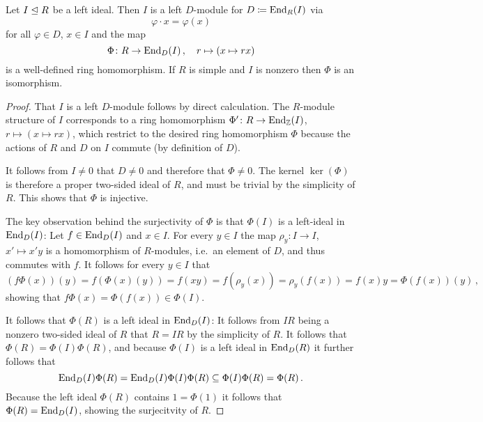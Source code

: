 \begin{lemma}
  \label{lemma: rieffels theorem}
  Let $I \trianglelefteq R$ be a left ideal.
  Then $I$ is a left $D$-module for $D \coloneqq \operatorname{End}_R(I)$ via
  \[
      \varphi \cdot x
    = \varphi(x)
  \]
  for all $\varphi \in D$, $x \in I$ and the map
  \[
            \Phi    
    \colon  R
    \to     \operatorname{End}_D(I)\,,
    \quad   r
    \mapsto (x \mapsto rx)
  \]
  is a well-defined ring homomorphism.
  If $R$ is simple and $I$ is nonzero then $\Phi$ is an isomorphism.
\end{lemma}


\begin{proof}
  That $I$ is a left $D$-module follows by direct calculation.
  The $R$-module structure of $I$ corresponds to a ring homomorphism $\Phi' \colon R \to \operatorname{End}_{\mathbb{Z}}(I)$, $r \mapsto (x \mapsto rx)$, which restrict to the desired ring homomorphism $\Phi$ because the actions of $R$ and $D$ on $I$ commute (by definition of $D$).
  
  It follows from $I \neq 0$ that $D \neq 0$ and therefore that $\Phi \neq 0$.
  The kernel $\ker(\Phi)$ is therefore a proper two-sided ideal of $R$, and must be trivial by the simplicity of $R$.
  This shows that $\Phi$ is injective.
  
  The key observation behind the surjectivity of $\Phi$ is that $\Phi(I)$ is a left-ideal in $\operatorname{End}_D(I)$:
  Let $f \in \operatorname{End}_D(I)$ and $x \in I$.
  For every $y \in I$ the map $\rho_y \colon I \to I$, $x' \mapsto x'y$ is a homomorphism of $R$-modules, i.e.\ an element of $D$, and thus commutes with $f$.
  It follows for every $y \in I$ that
  \[
      (f \Phi(x))(y)
    = f(\Phi(x)(y))
    = f(xy)
    = f(\rho_y(x))
    = \rho_y(f(x))
    = f(x)y
    = \Phi(f(x))(y) \,,
  \]
  showing that $f \Phi(x) = \Phi(f(x)) \in \Phi(I)$.
  
  It follows that $\Phi(R)$ is a left ideal in $\operatorname{End}_D(I)$:
  It follows from $IR$ being a nonzero two-sided ideal of $R$ that $R = IR$ by the simplicity of $R$.
  It follows that $\Phi(R) = \Phi(I)\Phi(R)$, and because $\Phi(I)$ is a left ideal in $\operatorname{End}_D(R)$ it further follows that
  \[
              \operatorname{End}_D(I) \Phi(R)
    =         \operatorname{End}_D(I) \Phi(I) \Phi(R)
    \subseteq \Phi(I) \Phi(R)
    =         \Phi(R) \,.
  \]
  Because the left ideal $\Phi(R)$ contains $1 = \Phi(1)$ it follows that $\Phi(R) = \operatorname{End}_D(I)$, showing the surjecitvity of $R$.
\end{proof}


